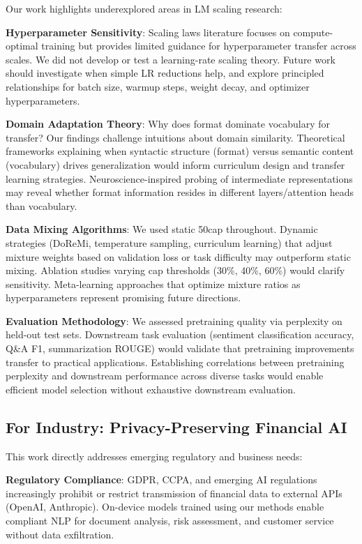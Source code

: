Our work highlights underexplored areas in LM scaling research:

\textbf{Hyperparameter Sensitivity}: Scaling laws literature \parencite{kaplan2020scaling, hoffmann2022training} focuses on compute-optimal training but provides limited guidance for hyperparameter transfer across scales. We did not develop or test a learning-rate scaling theory. Future work should investigate when simple LR reductions help, and explore principled relationships for batch size, warmup steps, weight decay, and optimizer hyperparameters.

\textbf{Domain Adaptation Theory}: Why does format dominate vocabulary for transfer? Our findings challenge intuitions about domain similarity. Theoretical frameworks explaining when syntactic structure (format) versus semantic content (vocabulary) drives generalization would inform curriculum design and transfer learning strategies. Neuroscience-inspired probing of intermediate representations may reveal whether format information resides in different layers/attention heads than vocabulary.

\textbf{Data Mixing Algorithms}: We used static 50cap throughout. Dynamic strategies (DoReMi, temperature sampling, curriculum learning) that adjust mixture weights based on validation loss or task difficulty may outperform static mixing. Ablation studies varying cap thresholds (30\%, 40\%, 60\%) would clarify sensitivity. Meta-learning approaches that optimize mixture ratios as hyperparameters represent promising future directions.

\textbf{Evaluation Methodology}: We assessed pretraining quality via perplexity on held-out test sets. Downstream task evaluation (sentiment classification accuracy, Q\&A F1, summarization ROUGE) would validate that pretraining improvements transfer to practical applications. Establishing correlations between pretraining perplexity and downstream performance across diverse tasks would enable efficient model selection without exhaustive downstream evaluation.

\subsection{For Industry: Privacy-Preserving Financial AI}

This work directly addresses emerging regulatory and business needs:

\textbf{Regulatory Compliance}: GDPR, CCPA, and emerging AI regulations increasingly prohibit or restrict transmission of financial data to external APIs (OpenAI, Anthropic). On-device models trained using our methods enable compliant NLP for document analysis, risk assessment, and customer service without data exfiltration.

